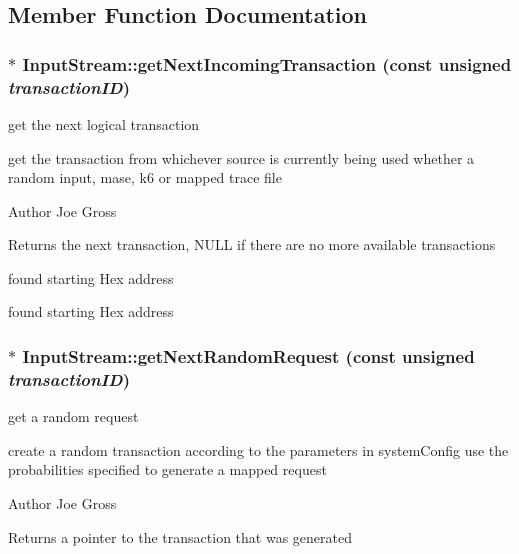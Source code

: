 \subsection{Member Function Documentation}
\subsubsection[{getNextIncomingTransaction}]{ $\ast$ InputStream::getNextIncomingTransaction (const unsigned {\em transactionID})}\label{class_d_r_a_msim_i_i_1_1_input_stream_a0dcd689dfcc42d4fddb6bc325300a384}


get the next logical transaction 

get the transaction from whichever source is currently being used whether a random input, mase, k6 or mapped trace file \begin{DoxyAuthor}{Author}
Joe Gross 
\end{DoxyAuthor}
\begin{DoxyReturn}{Returns}
the next transaction, NULL if there are no more available transactions 
\end{DoxyReturn}


found starting Hex address

found starting Hex address 

\subsubsection[{getNextRandomRequest}]{ $\ast$ InputStream::getNextRandomRequest (const unsigned {\em transactionID})}\label{class_d_r_a_msim_i_i_1_1_input_stream_a1d09b25ce313f34a0b1034582306ccef}


get a random request 

create a random transaction according to the parameters in systemConfig use the probabilities specified to generate a mapped request \begin{DoxyAuthor}{Author}
Joe Gross 
\end{DoxyAuthor}
\begin{DoxyReturn}{Returns}
a pointer to the transaction that was generated 
\end{DoxyReturn}

